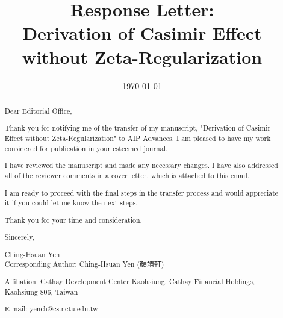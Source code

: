 \documentclass[prl,amsmath,amssymb,12pt]{revtex4-2}
\begin{document}
\title{Response Letter:\\Derivation of Casimir Effect without Zeta-Regularization}

\date{\today}

\begin{abstract}
Dear Editorial Office,

Thank you for notifying me of the transfer of my manuscript, "Derivation of Casimir Effect without Zeta-Regularization" to AIP Advances. I am pleased to have my work considered for publication in your esteemed journal.

I have reviewed the manuscript and made any necessary changes. I have also addressed all of the reviewer comments in a cover letter, which is attached to this email.

I am ready to proceed with the final steps in the transfer process and would appreciate it if you could let me know the next steps.

Thank you for your time and consideration.

Sincerely,

Ching-Hsuan Yen\\


\noindent Corresponding Author: Ching-Hsuan Yen (顏靖軒)

\noindent Affiliation: Cathay Development Center Kaohsiung, Cathay Financial Holdings, Kaohsiung 806, Taiwan

\noindent E-mail: yench@cs.nctu.edu.tw

\end{abstract}

\maketitle
\end{document}
